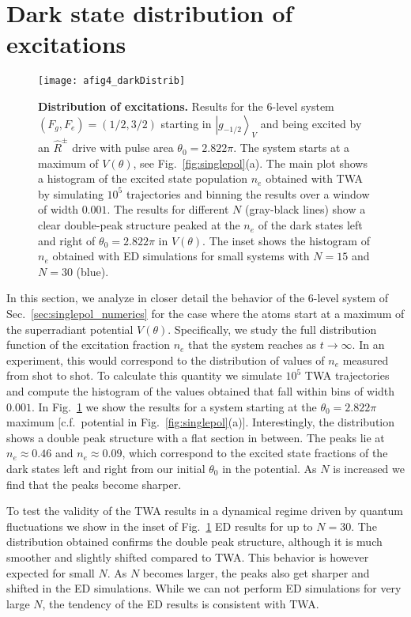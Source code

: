 \documentclass[aps,prx,superscriptaddress,twocolumn,notitlepage,nofootinbib,longbibliography]{revtex4-2}
\newcommand{\ket}[1]{\left|#1\right>}
\begin{document}

\section{Dark state distribution of excitations\label{app:dark_distrib}}

\begin{figure}[t]
\centering
\texttt{[image: afig4\_darkDistrib]}
\caption{\textbf{Distribution of excitations.} Results for the 6-level system $(F_g,F_e)=(1/2,3/2)$ starting in $\ket{g_{-1/2}}_V$ and being excited by an $\hat{R}^\pm$ drive with pulse area $\theta_0=2.822\pi$. The system starts at a maximum of $V(\theta)$, see Fig.~\ref{fig:singlepol}(a). The main plot shows a histogram of the excited state population $n_e$ obtained with TWA by simulating $10^5$ trajectories and binning the results over a window of width $0.001$. The results for different $N$ (gray-black lines) show a clear double-peak structure peaked at the $n_e$ of the dark states left and right of $\theta_0=2.822\pi$ in $V(\theta)$. The inset shows the histogram of $n_e$ obtained with ED simulations for small systems with $N=15$ and $N=30$ (blue).}
\label{fig:darkDistrib}
\end{figure}

In this section, we analyze in closer detail the behavior of the 6-level system of Sec.~\ref{sec:singlepol_numerics} for the case where the atoms start at a maximum of the superradiant potential $V(\theta)$. Specifically, we study the full distribution function of the excitation fraction $n_e$ that the system reaches as $t\rightarrow\infty$. In an experiment, this would correspond to the distribution of values of $n_e$ measured from shot to shot.
To calculate this quantity we simulate $10^5$ TWA trajectories and compute the histogram of the values obtained that fall within bins of width $0.001$. 
In Fig.~\ref{fig:darkDistrib} we show the results for a system starting at the $\theta_0=2.822\pi$ maximum [c.f.~potential in Fig.~\ref{fig:singlepol}(a)]. Interestingly, the distribution shows a double peak structure with a flat section in between. The peaks lie at $n_e\approx 0.46$ and $n_e\approx 0.09$, which correspond to the excited state fractions of the dark states left and right from our initial $\theta_0$ in the potential. As $N$ is increased we find that the peaks become sharper.

To test the validity of the TWA results in a dynamical regime driven by quantum fluctuations we show in the inset of Fig.~\ref{fig:darkDistrib} ED results for up to $N=30$. The distribution obtained confirms the double peak structure, although it is much smoother and slightly shifted compared to TWA. This behavior is however expected for small $N$.
As $N$ becomes larger, the peaks also get sharper and shifted in the ED simulations.
While we can not perform ED simulations for very large $N$, the tendency of the ED results is consistent with TWA.
\end{document}

